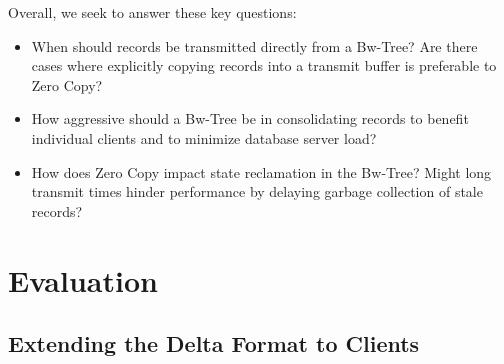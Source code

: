 Overall, we seek to answer these key questions:
\begin{itemize}
\item
When should records be transmitted directly from a Bw-Tree? Are there cases
where explicitly copying records into a transmit buffer is preferable to Zero Copy?
\item
How aggressive should a Bw-Tree be in consolidating records to benefit individual
clients and to minimize database server load?
\item
How does Zero Copy impact state reclamation in the Bw-Tree? Might long transmit
times hinder performance by delaying garbage collection of stale records?
\end{itemize}














\section{Evaluation}

\subsection{Extending the Delta Format to Clients}


